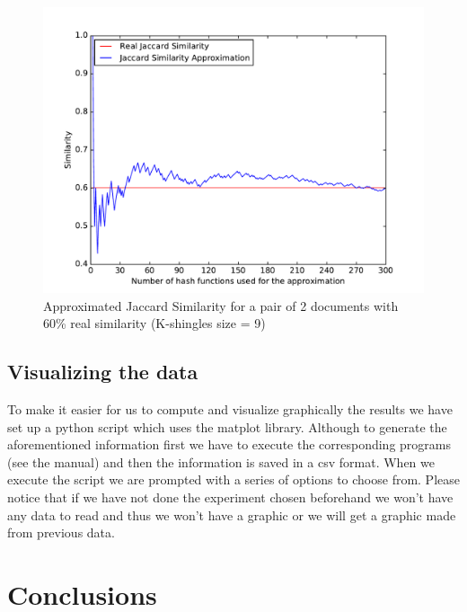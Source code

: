 \documentclass[12pt]{article}
\begin{document}
{\begin{figure}[H]
	\centering
	\includegraphics[scale=0.55]{graphs/JaccardSimilarityVsApproximation.pdf}
	\caption{Approximated Jaccard Similarity for a pair of 2 documents with 60\% real similarity (K-shingles size = 9)}
	\label{fig:JaccardVsApprox}
\end{figure}
\subsection{Visualizing the data}
To make it easier for us to compute and visualize graphically the results we have set up a python script which uses the matplot library. Although to generate the aforementioned information first we have to execute the corresponding programs (see the manual) and then the information is saved in a csv format. When we execute the script we are prompted with a series of options to choose from. Please notice that if we have not done the experiment chosen beforehand we won't have any data to read and thus we won't have a graphic or we will get a graphic made from previous data.
\clearpage
\section{Conclusions}

}
\end{document}
